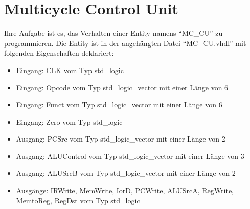 \documentclass[a4paper,12pt]{article}
\begin{document}
\pagestyle{empty}
\setlength{\parindent}{0em}
\section*{\noindent Multicycle Control Unit }
Ihre Aufgabe ist es, das Verhalten einer Entity  namens "`MC\_CU"' zu programmieren. Die Entity ist in der angeh\"angten Datei "`MC\_CU.vhdl"' mit folgenden Eigenschaften deklariert:

\begin{itemize}
	\item Eingang: CLK vom Typ std\_logic
	\item Eingang: Opcode vom Typ std\_logic\_vector mit einer L\"ange von 6
	\item Eingang: Funct vom Typ std\_logic\_vector mit einer L\"ange von 6
	\item Eingang: Zero vom Typ std\_logic

	\item Ausgang: PCSrc vom Typ std\_logic\_vector mit einer L\"ange von 2
	\item Ausgang: ALUControl vom Typ std\_logic\_vector mit einer L\"ange von 3
	\item Ausgang: ALUSrcB vom Typ std\_logic\_vector mit einer L\"ange von 2
	\item Ausg\"ange: IRWrite, MemWrite, IorD, PCWrite, ALUSrcA, RegWrite, MemtoReg, RegDst vom Typ std\_logic

\end{itemize}
\end{document}
